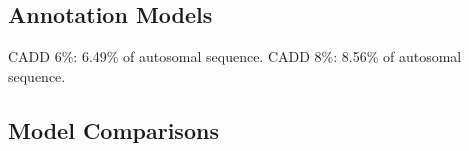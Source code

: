 \documentclass[11pt]{article}
\begin{document}
\subsection{Annotation Models}


CADD 6\%: 6.49\% of autosomal sequence.
CADD 8\%: 8.56\% of autosomal sequence.



\subsection{Model Comparisons}

\end{document}

